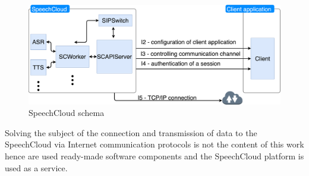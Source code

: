 \begin{figure}[H]
    \centering
    \includegraphics[width=\textwidth]{img/speechcloud_schema.png}
    \caption{SpeechCloud schema}
    \label{fig:speechcloud_schema}
\end{figure}

Solving the subject of the connection and transmission of data to the SpeechCloud via Internet communication protocols is not the content of this work hence are used ready-made software components and the SpeechCloud platform is used as a service.